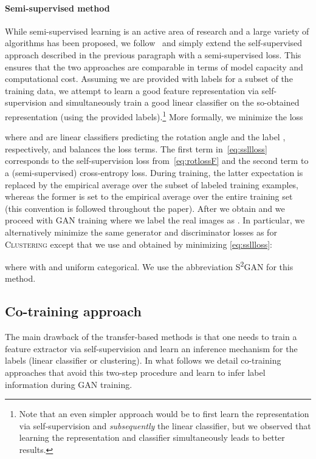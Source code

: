 \documentclass{article}
\newcommand{\tranSS}{\textsc{S\textsuperscript{2}GAN}}
\newcommand{\tranC}{\textsc{Clustering}}
\begin{document}
\paragraph{Semi-supervised method}
While semi-supervised learning is an active area of research and a large variety of algorithms has been proposed, we follow~\citet{zhai2019s4l} and simply extend the self-supervised approach described in the previous paragraph with a semi-supervised loss. This ensures that the two approaches are comparable in terms of model capacity and computational cost. Assuming we are provided with labels for a subset of the training data, we attempt to learn a good feature representation via self-supervision and simultaneously train a good linear classifier on the so-obtained representation (using the provided labels).\footnote{Note that an even simpler approach would be to first learn the representation via self-supervision and \emph{subsequently} the linear classifier, but we observed that learning the representation and classifier simultaneously leads to better results.} More formally, we minimize the loss

where  and  are linear classifiers predicting the rotation angle  and the label , respectively, and  balances the loss terms. The first term in~\eqref{eq:ssllloss} corresponds to the self-supervision loss from~\eqref{eq:rotlossF} and the second term to a (semi-supervised) cross-entropy loss. During training, the latter expectation is replaced by the empirical average over the subset of labeled training examples, whereas the former is set to the empirical average over the entire training set (this convention is followed throughout the paper). After we obtain  and  we proceed with GAN training where we label the real images as . In particular, we alternatively minimize the same generator and discriminator losses as for \tranC{} except that we use  and  obtained by minimizing \eqref{eq:ssllloss}:

where  with  and  uniform categorical. We use the abbreviation \tranSS{} for this method.

\subsection{Co-training approach} \label{sec:directmethods}
The main drawback of the transfer-based methods is that one needs to train a feature extractor  via self-supervision and learn an inference mechanism for the labels (linear classifier or clustering). In what follows we detail co-training approaches that avoid this two-step procedure and learn to infer label information during GAN training.
\end{document}

